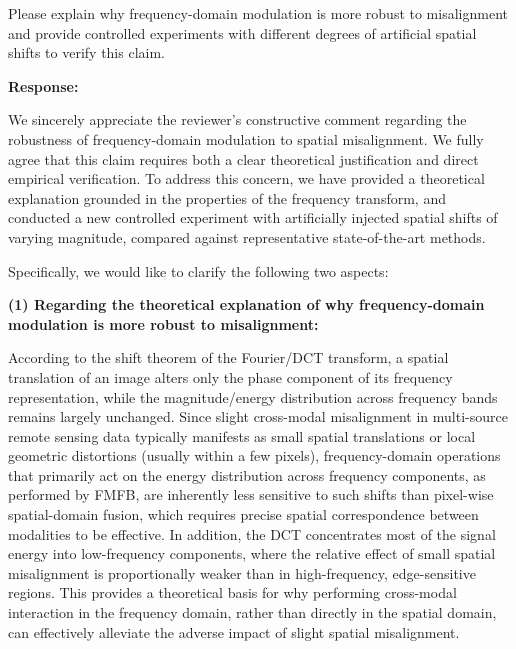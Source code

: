 \vspace{2em}

\begin{tcolorbox}[title={Reviewer \#1, Comment \#2}]
  \vspace{1em}
  
  \color{blue}
  Please explain why frequency-domain modulation is more robust to misalignment and provide controlled experiments with different degrees of artificial spatial shifts to verify this claim.

  \vspace{1em}
\end{tcolorbox}

\textbf{Response:}

We sincerely appreciate the reviewer's constructive comment regarding the robustness of frequency-domain modulation to spatial misalignment. We fully agree that this claim requires both a clear theoretical justification and direct empirical verification. To address this concern, we have provided a theoretical explanation grounded in the properties of the frequency transform, and conducted a new controlled experiment with artificially injected spatial shifts of varying magnitude, compared against representative state-of-the-art methods.

Specifically, we would like to clarify the following two aspects:

\textbf{(1) Regarding the theoretical explanation of why frequency-domain modulation is more robust to misalignment:}

According to the shift theorem of the Fourier/DCT transform, a spatial translation of an image alters only the phase component of its frequency representation, while the magnitude/energy distribution across frequency bands remains largely unchanged. Since slight cross-modal misalignment in multi-source remote sensing data typically manifests as small spatial translations or local geometric distortions (usually within a few pixels), frequency-domain operations that primarily act on the energy distribution across frequency components, as performed by FMFB, are inherently less sensitive to such shifts than pixel-wise spatial-domain fusion, which requires precise spatial correspondence between modalities to be effective. In addition, the DCT concentrates most of the signal energy into low-frequency components, where the relative effect of small spatial misalignment is proportionally weaker than in high-frequency, edge-sensitive regions. This provides a theoretical basis for why performing cross-modal interaction in the frequency domain, rather than directly in the spatial domain, can effectively alleviate the adverse impact of slight spatial misalignment.

